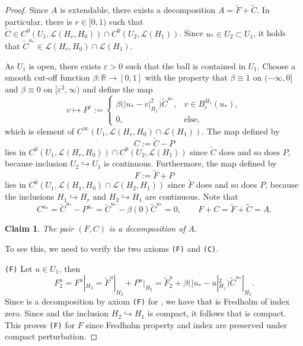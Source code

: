 \documentclass[pdftex]{sigma}
\numberwithin{equation}{section}
\newtheorem*{Claim*}{Claim}
\newcommand{\R}{{\mathbb{R}}}
\newcommand{\Ll}{{\mathcal{L}}} %
\newcommand{\eps}{{\varepsilon}}
\def\abs#1{\mathopen|#1\mathclose|}
\newcommand{\INTO}{\hookrightarrow} %
\newcommand{\1}{{{\mathchoice {\rm 1\mskip-4mu l} {\rm 1\mskip-4mu l}
{\rm 1\mskip-4.5mu l} {\rm 1\mskip-5mu l}}}}
\begin{document}
\begin{proof}
Since $A$ is extendable, there exists a decomposition $A=\tilde
F+\tilde C$.
In particular, there is $r\in[0,1)$ such that
$\tilde C\in C^0(U_1,\Ll(H_r,H_0))\cap C^0(U_2,\Ll(H_1))$.
Since $u_*\in U_2\subset U_1$, it holds that
$
 \tilde C^{u_*}\in \Ll(H_r,H_0)\cap \Ll(H_1)
$.

As $U_1$ is open, there exists $\eps>0$ such that the
ball \smash{$B_\eps^{H_1}(u_*)=\{v\in H_1\mid \abs{v-u_*}_{H_1}<\eps\}$} is contained
in $U_1$.
Choose a smooth cut-off function $\beta\colon\R\to[0,1]$
with the property that $\beta\equiv 1$ on $(-\infty,0]$
and $\beta\equiv 0$ on $\bigl[\eps^2,\infty\bigr)$
and define the map
\[
 v\mapsto
 P^v:=
 \begin{cases}
 \beta\bigl(\abs{u_*-v}^2_{H_1}\bigr) \tilde C^{u_*},
 &\text{$v\in B_{\eps}^{H_1}(u_*)$},
 \\
 0, &\text{else},
 \end{cases}
\]
which is element of $C^\infty(U_1,\Ll(H_r,H_0)\cap \Ll(H_1))$.
The map defined by
\[
 C:=\tilde C-P
\]
lies in $C^0(U_1,\Ll(H_r,H_0))\cap C^0(U_2,\Ll(H_1))$
since $\tilde C$ does and so does $P$,
because inclusion $U_2\INTO U_1$ is continuous.
Furthermore, the map defined by
\[
 F:=\tilde F+P
\]
lies in $C^0(U_1,\Ll(H_1,H_0)\cap\Ll(H_2,H_1))$ since $\tilde F$ does
and so does $P$, because the inclusions ${H_1\INTO H_r}$ and $H_2\INTO
H_1$ are continuous.
Note that
\[
 C^{u_*}=\tilde C^{u_*}-P^{u_*}
 =\tilde C^{u_*}-\beta(0) \tilde C^{u_*}=0
 ,\qquad
 F+C=\tilde F+\tilde C=A .
\]

\begin{Claim*}
The pair $(F,C)$ is a decomposition of $A$.
\end{Claim*}

To see this, we need to verify the two axioms
\texttt{(F)} and \texttt{(C)}.

\texttt{(F)} Let $u\in U_1$, then
\begin{equation*}
 F^u_2 =F^u|_{H_2}
 =\tilde F^u|_{H_2} +P^u|_{H_2}
 =\tilde F^u_2+\beta\bigl(\abs{u_*-u}_{H_1}^2\bigr)\tilde C^{u_*}|_{H_2} .
\end{equation*}
Since  is a decomposition by axiom \texttt{(F)}
for , we have that 
is Fredholm of index zero.
Since \smash{$\tilde C^{u_*}\in \Ll(H_1)$} and
the inclusion $H_2\INTO H_1$ is compact,
it follows that  is compact.
This proves \texttt{(F)} for $F$ since Fredholm property and index are
preserved under compact perturbation.


\end{proof}
\end{document}
